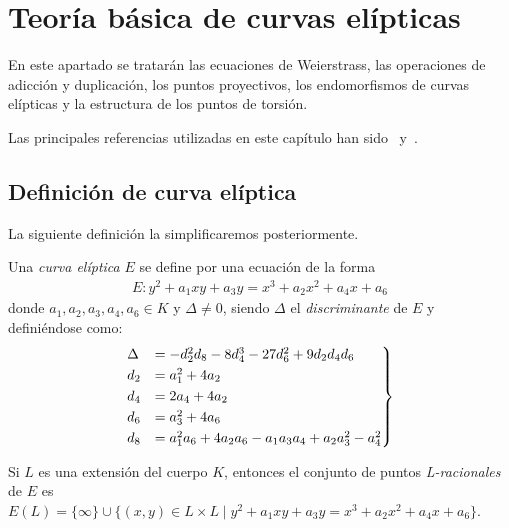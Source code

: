 \section{Teoría básica de curvas elípticas}
\label{sec:Teoría básica de curvas elípticas}

En este apartado se tratarán las ecuaciones de Weierstrass, las operaciones de adicción y duplicación, los puntos proyectivos, los endomorfismos de curvas elípticas y la estructura de los puntos de torsión.

Las principales referencias utilizadas en este capítulo han sido~\cite{Washington:2008} y~\cite{Hankerson:2003}.

\subsection{Definición de curva elíptica}
\label{sub:Definición de curva elíptica}

La siguiente definición la simplificaremos posteriormente.

\begin{definicion}
\label{def:curva elíptica}
	Una \emph{curva elíptica} $E$ se define por una ecuación de la forma
	\begin{align}\label{eq:Weierstrass general}
		E : y^2 + a_1 x y + a_3 y = x^3 + a_2 x^2 + a_4 x + a_6
	\end{align}
	donde $a_1, a_2, a_3, a_4, a_6 \in K$ y $\Delta \neq 0$, siendo $\Delta$ el \emph{discriminante} de $E$ y definiéndose como:
	\begin{align}
		\label{eq:discriminante}
		\begin{rcases}
		\Delta & = -d_2^2 d_8 - 8 d_4^3 - 27 d_6^2 + 9 d_2 d_4 d_6         \\
		d_2    & = a_1^2 + 4 a_ 2                                          \\
		d_4    & = 2 a_4 + 4 a_2                                           \\
		d_6    & = a_3^2 + 4 a_6                                           \\
		d_8    & = a_1^2 a_6 + 4 a_2 a_6 - a_1 a_3 a_4 + a_2 a_3^2 - a_4^2
		\end{rcases}
	\end{align}

	Si $L$ es una extensión del cuerpo $K$, entonces el conjunto de puntos \emph{L-racionales} de $E$ es $E(L) = \{\infty\} \cup \{(x, y) \in L \times L \mid y^2 + a_1 x y + a_3 y = x^3 + a_2 x^2 + a_4 x + a_6 \}$.
\end{definicion}

